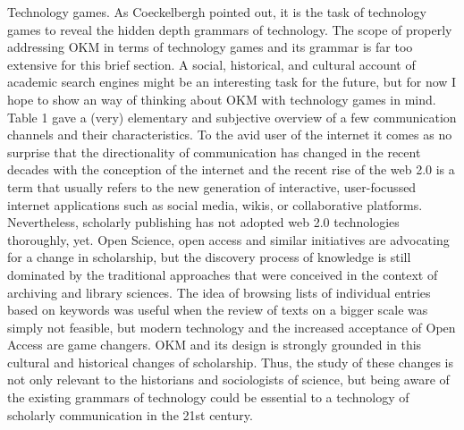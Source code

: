 Technology games. As Coeckelbergh pointed out, it is the task of
technology games to reveal the hidden depth grammars of technology. The
scope of properly addressing OKM in terms of technology games and its
grammar is far too extensive for this brief section. A social,
historical, and cultural account of academic search engines might be an
interesting task for the future, but for now I hope to show an way of
thinking about OKM with technology games in mind. Table 1 gave a (very)
elementary and subjective overview of a few communication channels and
their characteristics. To the avid user of the internet it comes as no
surprise that the directionality of communication has changed in the
recent decades with the conception of the internet and the recent rise
of the web 2.0 is a term that usually refers to the new
generation of interactive, user-focussed internet applications such as
social media, wikis, or collaborative platforms. Nevertheless,
scholarly publishing has not adopted web 2.0 technologies thoroughly,
yet. Open Science, open access and similar initiatives are advocating
for a change in scholarship, but the discovery process of knowledge is
still dominated by the traditional approaches that were conceived in the
context of archiving and library sciences. The idea of browsing lists of
individual entries based on keywords was useful when the review of texts
on a bigger scale was simply not feasible, but modern technology and the
increased acceptance of Open Access are game changers. OKM and its
design is strongly grounded in this cultural and historical changes of
scholarship. Thus, the study of these changes is not only relevant to
the historians and sociologists of science, but being aware of the
existing grammars of technology could be essential to a technology of
scholarly communication in the 21st century.